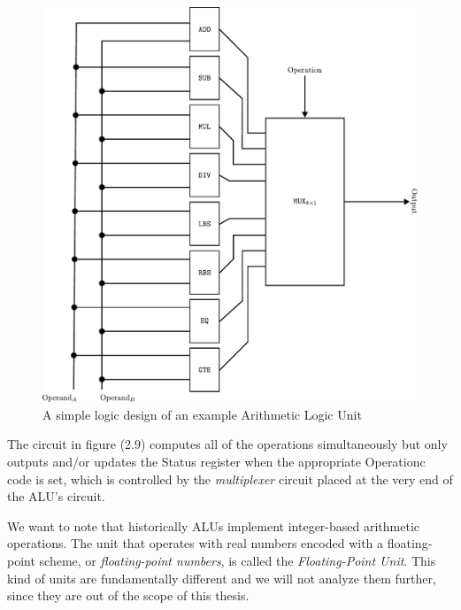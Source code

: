 \begin{figure}[ht]
    \centering
    \includegraphics[scale=.6]{images/2_Classical_Computing/alu_design.pdf}
    \caption{A simple logic design of an example Arithmetic Logic Unit}
\end{figure}

The circuit in figure (2.9) computes all of the operations simultaneously but only outputs and/or updates the Status register when the appropriate Operationc
code is set, which is controlled by the \textit{multiplexer} circuit placed at the very end of the ALU's circuit.

We want to note that historically ALUs implement integer-based arithmetic operations. The unit that operates with real numbers encoded with a floating-point scheme, or
\textit{floating-point numbers}, is called the \textit{Floating-Point Unit}. This kind of units are fundamentally different and we will not analyze them further, since
they are out of the scope of this thesis.